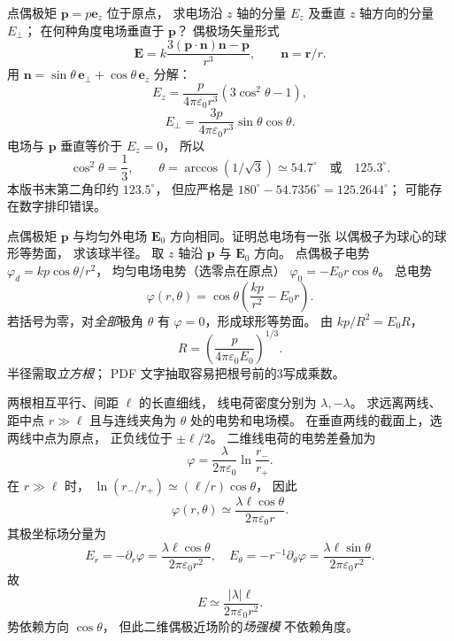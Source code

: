 点偶极矩 $\bm p=p\bm e_z$ 位于原点，
求电场沿 $z$ 轴的分量 $E_z$
及垂直 $z$ 轴方向的分量 $E_\perp$；
在何种角度电场垂直于 $\bm p$？
\exsolution
偶极场矢量形式
\[
\bm E=k\frac{3(\bm p\cdot\bm n)\bm n-\bm p}{r^3},
\qquad\bm n=\bm r/r.
\]
用
$\bm n=\sin\theta\,\bm e_\perp+
\cos\theta\,\bm e_z$ 分解：
\[
\boxed{E_z=\frac{p}{4\pi\varepsilon_0r^3}
(3\cos^2\theta-1)},
\]
\[
\boxed{E_\perp=\frac{3p}{4\pi\varepsilon_0r^3}
\sin\theta\cos\theta}.
\]
电场与 $\bm p$ 垂直等价于 $E_z=0$，
所以
\[
\cos^2\theta=\frac13,\qquad
\boxed{\theta=\arccos(1/\sqrt3)\simeq54.7^\circ
\quad\text{或}\quad125.3^\circ}.
\]
\excheck 本版书末第二角印约 $123.5^\circ$，
但应严格是
$180^\circ-54.7356^\circ=125.2644^\circ$；
可能存在数字排印错误。

点偶极矩 $\bm p$ 与均匀外电场 $\bm E_0$
方向相同。证明总电场有一张
以偶极子为球心的球形等势面，
求该球半径。
\exsolution
取 $z$ 轴沿 $\bm p$ 与 $\bm E_0$ 方向。
点偶极子电势
$\varphi_d=kp\cos\theta/r^2$，
均匀电场电势（选零点在原点）
$\varphi_0=-E_0r\cos\theta$。
总电势
\[
\varphi(r,\theta)=
\cos\theta\left(\frac{kp}{r^2}-E_0r\right).
\]
若括号为零，对\emph{全部}极角 $\theta$
有 $\varphi=0$，形成球形等势面。
由 $kp/R^2=E_0R$，
\[
\boxed{R=\left(\frac{p}{4\pi\varepsilon_0E_0}\right)^{1/3}}.
\]
\excheck 半径需取\emph{立方根}；
PDF 文字抽取容易把根号前的3写成乘数。

两根相互平行、间距 $\ell$ 的长直细线，
线电荷密度分别为 $\lambda,-\lambda$。
求远离两线、距中点 $r\gg\ell$
且与连线夹角为 $\theta$ 处的电势和电场模。
\exsolution
在垂直两线的截面上，选两线中点为原点，
正负线位于 $\pm\bm \ell/2$。
二维线电荷的电势差叠加为
\[
\varphi=\frac{\lambda}{2\pi\varepsilon_0}
\ln\frac{r_-}{r_+}.
\]
在 $r\gg\ell$ 时，
$\ln(r_-/r_+)\simeq(\ell/r)\cos\theta$，
因此
\[
\boxed{\varphi(r,\theta)\simeq
\frac{\lambda\ell\cos\theta}{2\pi\varepsilon_0r}}.
\]
其极坐标场分量为
\[
E_r=-\partial_r\varphi=
\frac{\lambda\ell\cos\theta}{2\pi\varepsilon_0r^2},
\quad
E_\theta=-r^{-1}\partial_\theta\varphi=
\frac{\lambda\ell\sin\theta}{2\pi\varepsilon_0r^2}.
\]
故
\[
\boxed{E\simeq\frac{|\lambda|\ell}{2\pi\varepsilon_0r^2}}.
\]
\excheck 势依赖方向 $\cos\theta$，
但此二维偶极近场阶的\emph{场强模}
不依赖角度。

